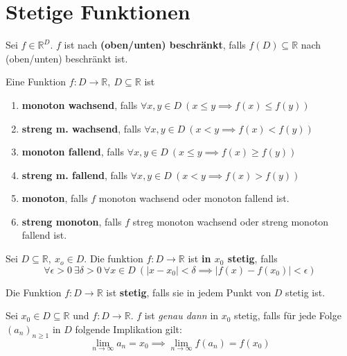 \documentclass[8pt,a4paper,twocolumn,table]{extarticle}
\newcommand{\R}{\mathbb{R}}
\newcommand{\seq}[1]{\left( #1_n \right)_{n \ge 1}}
\begin{document}
\section{Stetige Funktionen}
\begin{definition}{3.1}
    Sei $f \in \R^D$.
    $f$ ist nach \textbf{(oben/unten) beschränkt}, falls $f(D) \subseteq \R$ nach (oben/unten) beschränkt ist.
\end{definition}

\begin{definition}{3.2}
    Eine Funktion $f : D \to \R,\ D \subseteq \R$ ist
    \begin{enumerate}
        \item \textbf{monoton wachsend}, falls $\forall x,y \in D\ \left( x \le y \implies f(x) \le f(y) \right)$
        \item \textbf{streng m. wachsend}, falls $\forall x,y \in D\ \left( x < y \implies f(x) < f(y) \right)$
        \item \textbf{monoton fallend}, falls $\forall x,y \in D\ \left( x \le y \implies f(x) \ge f(y) \right)$
        \item \textbf{streng m. fallend}, falls $\forall x,y \in D\ \left( x < y \implies f(x) > f(y) \right)$
        \item \textbf{monoton}, falls $f$ monoton wachsend oder monoton fallend ist.
        \item \textbf{streng monoton}, falls $f$ streg monoton wachsend oder streng monoton fallend ist.
    \end{enumerate}
\end{definition}

\begin{definition}{3.4}
    Sei $D \subseteq \R,\ x_o \in D$. Die funktion $f: D \to \R$ ist \textbf{in $x_0$ stetig}, falls
    \[ \forall \epsilon > 0\ \exists \delta > 0\ \forall x \in D\ \left( \left| x - x_0 \right| < \delta \implies \left| f(x) - f(x_0) \right| < \epsilon \right) \]
\end{definition}

\begin{definition}{3.5}
    Die Funktion $f: D \to \R$ ist \textbf{stetig}, falls sie in jedem Punkt von $D$ stetig ist.
\end{definition}

\begin{satz}{3.7}
    Sei $x_0 \in D \subseteq \R$ und $f: D \to \R$.
    $f$ ist \textit{genau dann} in $x_0$ stetig, falls für jede Folge $\seq{a}$ in $D$ folgende Implikation gilt:
    \[ \lim_{n \to \infty} a_n = x_0 \implies \lim_{n \to \infty} f(a_n) = f(x_0) \]
\end{satz}
\end{document}
